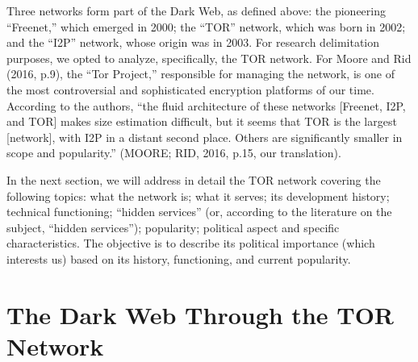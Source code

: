 Three networks form part of the Dark Web, as defined above: the pioneering ``Freenet,'' which emerged in 2000; the ``TOR'' network, which was born in 2002; and the ``I2P'' network, whose origin was in 2003. For research delimitation purposes, we opted to analyze, specifically, the TOR network. For Moore and Rid (2016, p.9), the ``Tor Project,'' responsible for managing the network, is one of the most controversial and sophisticated encryption platforms of our time. According to the authors, ``the fluid architecture of these networks {[}Freenet, I2P, and TOR{]} makes size estimation difficult, but it seems that TOR is the largest {[}network{]}, with I2P in a distant second place. Others are significantly smaller in scope and popularity.'' (MOORE; RID, 2016, p.15, our translation).

In the next section, we will address in detail the TOR network covering the following topics: what the network is; what it serves; its development history; technical functioning; ``hidden services'' (or, according to the literature on the subject, ``hidden services''); popularity; political aspect and specific characteristics. The objective is to describe its political importance (which interests us) based on its history, functioning, and current popularity.

\section{The Dark Web Through the TOR Network}

